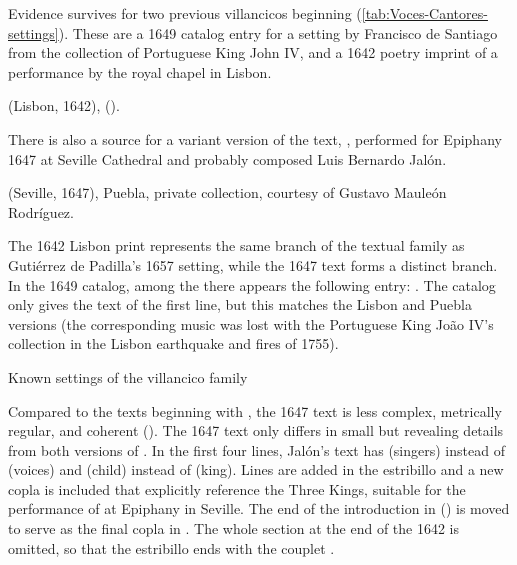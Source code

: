 Evidence survives for two previous villancicos beginning  (\cref{tab:Voces-Cantores-settings}).
These are a 1649 catalog entry for a setting by Francisco de Santiago from the
collection of Portuguese King John IV, and a 1642 poetry imprint of a
performance by the royal chapel in Lisbon.%
\begin{Footnote}
     (Lisbon, 1642),
     ().
\end{Footnote}
There is also a source for a variant version of the text, , performed for Epiphany 1647 at Seville Cathedral and probably composed
Luis Bernardo Jalón.%
\begin{Footnote}
     (Seville, 1647), Puebla, private
    collection, courtesy of Gustavo Mauleón Rodríguez.
\end{Footnote}
The 1642 Lisbon print represents the same branch of the textual family as
Gutiérrez de Padilla's 1657 setting, while the 1647  text
forms a distinct branch.
In the 1649 catalog, among the  there appears the following entry:
.%
    \Autocite[caixão 26, ]{JohnIV:Catalog}
The catalog only gives the text of the first line, but this matches the Lisbon
and Puebla versions (the corresponding music was lost with the Portuguese King
João IV's collection in the Lisbon earthquake and fires of 1755).

{Known settings of the  villancico family}

Compared to the texts beginning with , the 1647 text
 is less complex, metrically regular, and
coherent 
().
The 1647  text only differs in small but revealing details
from both versions of .
In the first four lines, Jalón's text has  (singers) instead
of  (voices) and  (child) instead of 
(king).
Lines are added in the estribillo and a new copla is included that explicitly
reference the Three Kings, suitable for the performance of  at
Epiphany in Seville.
The end of the introduction in  () is moved to serve as the final copla in .
The whole  section at the end of the 1642  is omitted,
so that the estribillo ends with the couplet .

